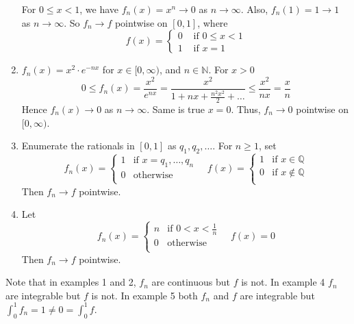 \documentclass[a4paper]{article}
\begin{document}
\begin{example}
\begin{enumerate}
        For $0 \leqslant x<1$, we have $f_{n}(x)=x^{n} \rightarrow 0$ as $n \rightarrow \infty$.
        Also, $f_{n}(1)=1 \rightarrow 1$ as $n \rightarrow \infty$. So $f_{n} \rightarrow f$ pointwise on $[0,1]$, where
        \[
        f(x)= \begin{cases}0 & \text { if } 0 \leqslant x<1 \\ 1 & \text { if } x=1\end{cases}
        \]
        \item $f_{n}(x)=x^{2} \cdot e^{-n x}$ for $x \in[0, \infty)$, and $n \in \mathbb{N}$. For $x>0$
        \[
        0 \leqslant f_{n}(x)=\frac{x^{2}}{e^{n x}}=\frac{x^{2}}{1+n x+\frac{n^{2} x^{2}}{2}+\ldots} \leqslant \frac{x^{2}}{n x}=\frac{x}{n}
        \]
        Hence $f_{n}(x) \rightarrow 0$ as $n \rightarrow \infty$. Same is true $x=0$. Thus, $f_{n} \rightarrow 0$ pointwise on $[0, \infty)$.
        \item Enumerate the rationals in $[0,1]$ as $ q_1,q_2,\dots $. For $n\ge 1$, set 
        \[
            f_n(x) = \begin{cases}
            1 &\text{if }x=q_1,\dots,q_n\\
            0 &\text{otherwise}\\
            \end{cases} \quad f(x) = \begin{cases}
            1 &\text{if }x\in \mathbb{Q}\\
            0 &\text{if }x \not\in  \mathbb{Q}\\
            \end{cases} 
        \]
        Then $f_n\to f$ pointwise. 
        \item Let 
        \[
            f_n(x) = \begin{cases}
            n &\text{if } 0<x<\frac{1}{n}\\
            0 &\text{otherwise}\\
            \end{cases} \quad f(x)=0
        \]
        Then $ f_n\to f $ pointwise. 
    \end{enumerate}
    Note that in examples 1 and 2, $f_n$ are continuous but $f$ is not. In example 4 $f_n$ are integrable but $f$ is not. In example 5 both $f_n$ and $f$ are integrable but $ \int_0^1 f_n=1\neq 0 = \int_0^1 f $. 
\end{example}
\end{document}
